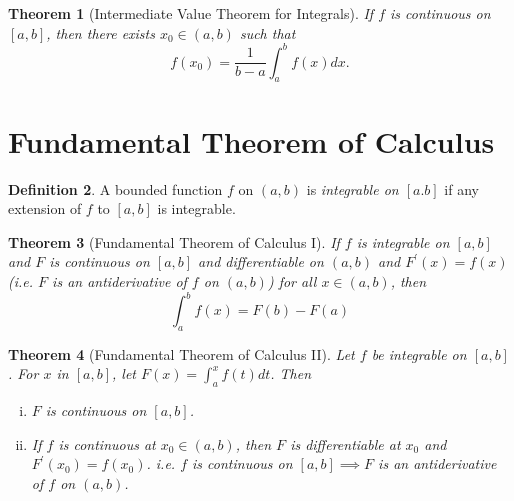 \documentclass[12pt, lettersize]{book}
\theoremstyle{plain}
\newtheorem{thm}{Theorem}[section]
\theoremstyle{definition}
\newtheorem{dfn}[thm]{Definition}
\theoremstyle{remark}
\begin{document}
	\begin{thm}[Intermediate Value Theorem for Integrals]
		If $f$ is continuous on $[a,b]$, then there exists $x_0\in(a,b)$ such that
		\begin{displaymath}
			f(x_0)=\frac{1}{b-a}\int_{a}^{b}f(x)dx.
		\end{displaymath}
	\end{thm}

	\newpage
	\section{Fundamental Theorem of Calculus}
	\begin{dfn}
		A bounded function $f$ on $(a,b)$ is \emph{integrable on $[a.b]$} if any extension of $f$ to $[a,b]$ is integrable.
	\end{dfn}
	
	\begin{thm}[Fundamental Theorem of Calculus I]
		If $f$ is integrable on $[a,b]$ and $F$ is continuous on $[a,b]$ and differentiable on $(a,b)$ and $F^\prime(x)=f(x)$ (i.e. $F$ is an antiderivative of $f$ on $(a,b)$) for all $x\in(a,b)$, then
		\begin{displaymath}
			\int_{a}^{b}f(x)=F(b)-F(a)
		\end{displaymath}
	\end{thm}
	
	\begin{thm}[Fundamental Theorem of Calculus II]
		Let $f$ be integrable on $[a,b]$. For $x$ in $[a,b]$, let $F(x)=\int_{a}^{x}f(t)dt$. Then
		\begin{enumerate}[(i)]
			\item $F$ is continuous on $[a,b]$.
			\item If $f$ is continuous at $x_0\in(a,b)$, then $F$ is differentiable at $x_0$ and $F^\prime(x_0)=f(x_0)$. i.e. $f$ is continuous on $[a,b]\implies F$ is an antiderivative of $f$ on $(a,b)$. 
		\end{enumerate}
	\end{thm}
\end{document}
